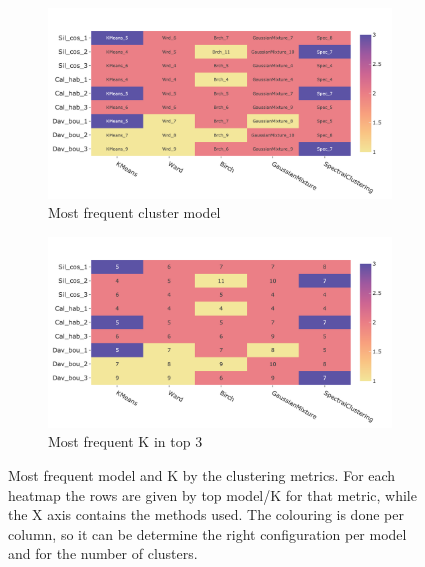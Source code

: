 \begin{figure}[!htb]
    \captionsetup[subfigure]{justification=Centering}
    \centering
    \begin{subfigure}[!t]{0.75\textwidth}
        \includegraphics[width=\textwidth]{Sections/ClusteringAnalysis/Resources/cs_top3/top3_cs_gen_top3_heatmap_pca.png}
        \caption{Most frequent cluster model}
        \label{fig:cs:heatmap_gen}
    \end{subfigure}
    \centering
    \begin{subfigure}[!t]{0.75\textwidth}
        \includegraphics[width=\textwidth]{Sections/ClusteringAnalysis/Resources/cs_top3/top3_cs_size_top3_heatmap_pca.png}
        \caption{Most frequent K in top 3}
        \label{fig:cs:heatmap_cs}
    \end{subfigure}
    \caption{Most frequent model and K by the clustering metrics. For each heatmap the rows are given by top model/K for that metric, while the X axis contains the methods used. The colouring is done per column, so it can be determine the right configuration per model and for the number of clusters.}
    \label{fig:cs:cs_metrics_heatmap}
\end{figure}

